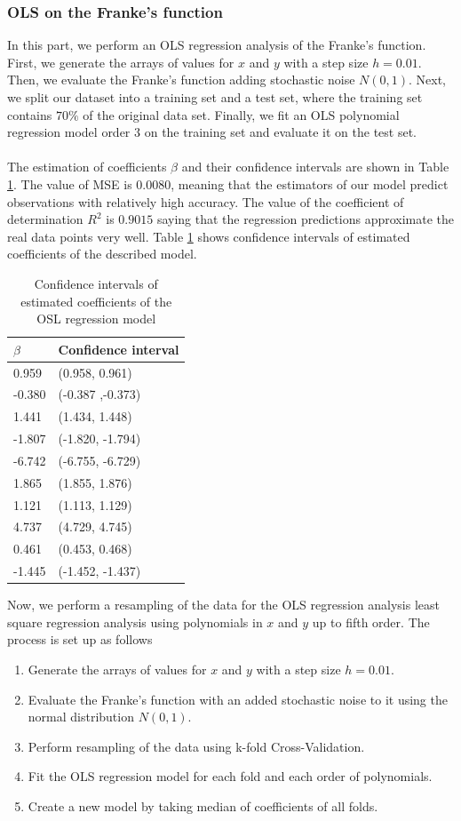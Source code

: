 \documentclass [11pt]{article}
\begin{document}
\subsubsection{OLS on the Franke's function}
In this part, we perform an OLS regression analysis of the Franke's function. First, we generate the arrays of values for $x$ and $y$ with a step size $h=0.01$. Then, we evaluate the Franke's function adding stochastic noise $N(0,1)$. Next, we split our dataset into a training set and a test set, where the training set contains $70\%$ of the original data set. Finally, we fit an OLS polynomial regression model order $3$ on the training set and evaluate it on the test set. \\
\\
The estimation of coefficients $\beta$ and their confidence intervals are shown in Table \ref{tab:olsfrane1}. The value of MSE is $0.0080$, meaning that the estimators of our model predict observations with relatively high accuracy. The value of the coefficient of determination $R^{2}$ is $0.9015$ saying that the regression predictions approximate the real data points very well. Table \ref{tab:olsfrane1} shows confidence intervals of estimated coefficients of the described model.
\begin{table}[H]
\centering
\begin{tabular}{ll}
\hline
$\beta$ & Confidence interval \\ \hline
0.959   & (0.958, 0.961)     \\
-0.380  & (-0.387 ,-0.373)   \\
1.441   & (1.434, 1.448)     \\
-1.807  & (-1.820,  -1.794)  \\
-6.742  & (-6.755, -6.729)   \\
1.865   & (1.855, 1.876)     \\
1.121   & (1.113, 1.129)     \\
4.737   & (4.729, 4.745)     \\
0.461   & (0.453, 0.468)     \\
-1.445  & (-1.452, -1.437)   \\ \hline
\end{tabular}
\caption{Confidence intervals of estimated coefficients of the OSL regression model}
\label{tab:olsfrane1}
\end{table}
Now, we perform a resampling of the data for the OLS regression analysis least square regression analysis using polynomials in $x$ and $y$ up to fifth order. The process is set up as follows
\begin{enumerate}
\item Generate the arrays of values for $x$ and $y$ with a step size $h=0.01$. 
\item Evaluate the Franke's function with an added stochastic noise to it using  the normal distribution $N(0,1)$.
\item Perform resampling of the data using k-fold Cross-Validation.
\item Fit the OLS regression model for each fold and each order of polynomials.
\item Create a new model by taking median of coefficients of all folds.
\end{enumerate}
\end{document}

